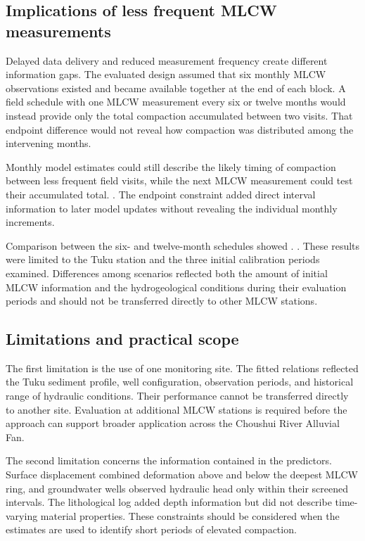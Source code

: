 \subsection{Implications of less frequent MLCW measurements}
\label{subsec:discussion_reduced_sampling_v2}

Delayed data delivery and reduced measurement frequency create different information gaps. The evaluated design assumed that six monthly MLCW observations existed and became available together at the end of each block. A field schedule with one MLCW measurement every six or twelve months would instead provide only the total compaction accumulated between two visits. That endpoint difference would not reveal how compaction was distributed among the intervening months.

Monthly model estimates could still describe the likely timing of compaction between less frequent field visits, while the next MLCW measurement could test their accumulated total. . The endpoint constraint added direct interval information to later model updates without revealing the individual monthly increments.

Comparison between the six- and twelve-month schedules showed . . These results were limited to the Tuku station and the three initial calibration periods examined. Differences among scenarios reflected both the amount of initial MLCW information and the hydrogeological conditions during their evaluation periods and should not be transferred directly to other MLCW stations.

\subsection{Limitations and practical scope}
\label{subsec:discussion_limitations_v2}

The first limitation is the use of one monitoring site. The fitted relations reflected the Tuku sediment profile, well configuration, observation periods, and historical range of hydraulic conditions. Their performance cannot be transferred directly to another site. Evaluation at additional MLCW stations is required before the approach can support broader application across the Choushui River Alluvial Fan.

The second limitation concerns the information contained in the predictors. Surface displacement combined deformation above and below the deepest MLCW ring, and groundwater wells observed hydraulic head only within their screened intervals. The lithological log added depth information but did not describe time-varying material properties. These constraints should be considered when the estimates are used to identify short periods of elevated compaction.

